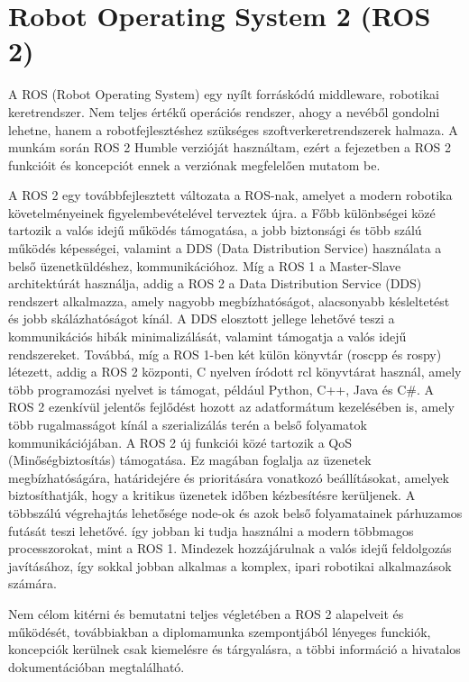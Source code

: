 \section{Robot Operating System 2 (ROS 2)}
A ROS (Robot Operating System) egy nyílt forráskódú middleware, robotikai keretrendszer. Nem teljes értékű operációs rendszer, ahogy a nevéből gondolni lehetne, hanem a robotfejlesztéshez szükséges szoftverkeretrendszerek halmaza. A munkám során ROS 2 Humble verzióját használtam, ezért a fejezetben a ROS 2 funkcióit és koncepciót ennek a verziónak megfelelően mutatom be. \cite{ros2} \cite{ros2_article}

A ROS 2 egy továbbfejlesztett változata a ROS-nak, amelyet a modern robotika követelményeinek figyelembevételével terveztek újra. a Főbb különbségei közé tartozik a valós idejű működés támogatása, a jobb biztonsági és több szálú működés képességei, valamint a DDS (Data Distribution Service) használata a belső üzenetküldéshez, kommunikációhoz. Míg a ROS 1 a Master-Slave architektúrát használja, addig a ROS 2 a Data Distribution Service (DDS) rendszert alkalmazza, amely nagyobb megbízhatóságot, alacsonyabb késleltetést és jobb skálázhatóságot kínál. A DDS elosztott jellege lehetővé teszi a kommunikációs hibák minimalizálását, valamint támogatja a valós idejű rendszereket. Továbbá, míg a ROS 1-ben két külön könyvtár (roscpp és rospy) létezett, addig a ROS 2 központi, C nyelven íródott rcl könyvtárat használ, amely több programozási nyelvet is támogat, például Python, C++, Java és C\#. A ROS 2 ezenkívül jelentős fejlődést hozott az adatformátum kezelésében is, amely több rugalmasságot kínál a szerializálás terén a belső folyamatok kommunikációjában. A ROS 2 új funkciói közé tartozik a QoS (Minőségbiztosítás) támogatása. Ez magában foglalja az üzenetek megbízhatóságára, határidejére és prioritására vonatkozó beállításokat, amelyek biztosíthatják, hogy a kritikus üzenetek időben kézbesítésre kerüljenek. A többszálú végrehajtás lehetősége node-ok és azok belső folyamatainek párhuzamos futását teszi lehetővé. így jobban ki tudja használni a modern többmagos processzorokat, mint a ROS 1. Mindezek hozzájárulnak a valós idejű feldolgozás javításához, így sokkal jobban alkalmas a komplex, ipari robotikai alkalmazások számára. \cite{ros2} \cite{ros2_article}

Nem célom kitérni és bemutatni teljes végletében a ROS 2 alapelveit és működését, továbbiakban a diplomamunka szempontjából lényeges funckiók, koncepciók kerülnek csak kiemelésre és tárgyalásra, a többi információ a hivatalos dokumentációban megtalálható.

